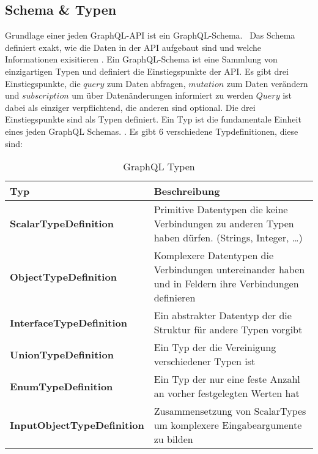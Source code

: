 \subsection{Schema \& Typen}
\label{schematypes}

Grundlage einer jeden GraphQL-API ist ein GraphQL-Schema.~\cite[vgl. Core Concepts]{graphqlspecification}
Das Schema definiert exakt, wie die Daten in der API aufgebaut sind und welche Informationen exisitieren \cite[vgl. 3.2 Schema]{graphqlspecification}.
Ein GraphQL-Schema ist eine Sammlung von einzigartigen Typen und definiert die Einstiegspunkte der API.
Es gibt drei Einstiegspunkte, die $query$ zum Daten abfragen, $mutation$ zum Daten verändern und $subscription$ um über Datenänderungen informiert zu werden \cite[vgl. 3.2.1 Root Operation Types]{graphqlspecification}
$Query$ ist dabei als einziger verpflichtend, die anderen sind optional. \cite[vgl. 3.2.1]{graphqlspecification}
Die drei Einstiegspunkte sind als Typen definiert.
Ein Typ ist die fundamentale Einheit eines jeden GraphQL Schemas. \cite[vgl. 3.4 Types]{graphqlspecification}.
\newpage
Es gibt 6 verschiedene Typdefinitionen, diese sind:

\begin{center}
    \begin{table}[!ht]
        \begin{tabularx}{\textwidth}{|C|C|}
            \hline
            \textbf{ Typ } & \textbf{ Beschreibung} \\
            \hline
            \textbf{ ScalarTypeDefinition } & Primitive Datentypen die keine Verbindungen zu anderen Typen haben dürfen. (Strings, Integer, \ldots) \\
            \hline
            \textbf{ ObjectTypeDefinition  } & Komplexere Datentypen die Verbindungen untereinander haben und in Feldern ihre Verbindungen definieren \\
            \hline
            \textbf{ InterfaceTypeDefinition } & Ein abstrakter Datentyp der die Struktur für andere Typen vorgibt \\
            \hline
            \textbf{ UnionTypeDefinition } & Ein Typ der die Vereinigung verschiedener Typen ist \\
            \hline
            \textbf{ EnumTypeDefinition } & Ein Typ der nur eine feste Anzahl an vorher festgelegten Werten hat \\
            \hline
            \textbf{ InputObjectTypeDefinition } & Zusammensetzung von ScalarTypes um komplexere Eingabeargumente zu bilden  \\
            \hline
        \end{tabularx}
        \caption{GraphQL Typen\cite[vgl. 3.4 Types]{graphqlspecification}}
    \end{table}
\end{center}

